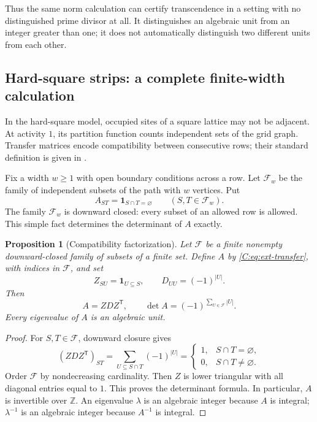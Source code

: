 \documentclass[11pt,a4paper]{article}
\newtheorem{proposition}[theorem]{Proposition}
\theoremstyle{definition}
\theoremstyle{remark}
\numberwithin{equation}{section}
\begin{document}
Thus the same norm calculation can certify transcendence in a setting with no
distinguished prime divisor at all.  It distinguishes an algebraic unit from
an integer greater than one; it does not automatically distinguish two
different units from each other.

\subsection{Hard-square strips: a complete finite-width calculation}

In the hard-square model, occupied sites of a square lattice may not be
adjacent.  At activity $1$, its partition function counts independent sets of
the grid graph.  Transfer matrices encode compatibility between consecutive
rows; their standard definition is given in \cite[Section~2]{R081}.

Fix a width $w\ge1$ with open boundary conditions across a row.  Let
$\mathcal F_w$ be the family of independent subsets of the path with $w$
vertices.  Put
\begin{equation}
 A_{ST}=\mathbf1_{S\cap T=\varnothing}\qquad(S,T\in\mathcal F_w).
 \label{C:eq:ext-transfer}
\end{equation}
The family $\mathcal F_w$ is downward closed: every subset of an allowed row
is allowed.  This simple fact determines the determinant of $A$ exactly.

\begin{proposition}[Compatibility factorization]
\label{C:prop:ext-factorization}
Let $\mathcal F$ be a finite nonempty downward-closed family of subsets of a
finite set.  Define $A$ by \eqref{C:eq:ext-transfer}, with indices in
$\mathcal F$, and set
\[
 Z_{SU}=\mathbf1_{U\subseteq S},\qquad
 D_{UU}=(-1)^{|U|}.
\]
Then
\begin{equation}
 A=ZDZ^{\mathsf T},\qquad
 \det A=(-1)^{\sum_{U\in\mathcal F}|U|}.
 \label{C:eq:ext-zdz}
\end{equation}
Every eigenvalue of $A$ is an algebraic unit.
\end{proposition}
\begin{proof}
For $S,T\in\mathcal F$, downward closure gives
\[
 (ZDZ^{\mathsf T})_{ST}
 =\sum_{U\subseteq S\cap T}(-1)^{|U|}
 =\begin{cases}1,&S\cap T=\varnothing,\\0,&S\cap T\ne\varnothing.
 \end{cases}
\]
Order $\mathcal F$ by nondecreasing cardinality.  Then $Z$ is lower
triangular with all diagonal entries equal to $1$.  This proves the
determinant formula.  In particular, $A$ is invertible over $\mathbb Z$.
An eigenvalue $\lambda$ is an algebraic integer because $A$ is integral;
$\lambda^{-1}$ is an algebraic integer because $A^{-1}$ is integral.
\end{proof}
\end{document}
